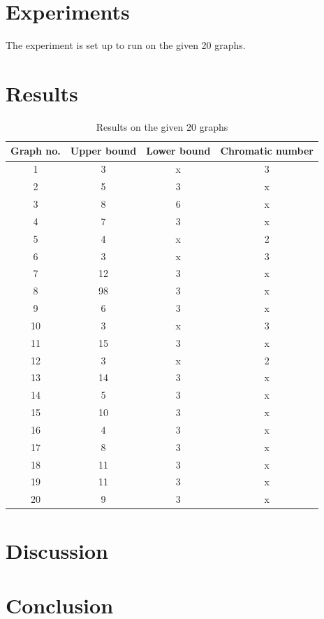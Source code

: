 \documentclass[a4paper]{report}
\begin{document}
		
	\chapter{Experiments}
	The experiment is set up to run on the given 20 graphs.
	\chapter{Results}
		\begin{table} [h!]
		\begin{center}
			\begin{tabular}{| c | c | c | c |}
				\hline
				Graph no. & Upper bound & Lower bound & Chromatic number  \\
				\hline
				1 & 3 & x & 3 \\
				\hline
				2 & 5 & 3 & x \\
				\hline
				3 & 8 & 6 & x \\
				\hline
				4 & 7 & 3 & x \\
				\hline
				5 & 4 & x & 2 \\
				\hline
				6 & 3 & x & 3 \\
				\hline
				7 & 12 & 3 & x \\
				\hline
				8 & 98 & 3 & x \\
				\hline
				9 & 6 & 3 & x \\
				\hline
				10 & 3 & x & 3 \\
				\hline
				11 & 15 & 3 & x \\
				\hline
				12 & 3 & x & 2 \\
				\hline
				13 & 14 & 3 & x \\
				\hline
				14 & 5 & 3 & x \\
				\hline
				15 & 10 & 3 & x \\
				\hline
				16 & 4 & 3 & x \\
				\hline
				17 & 8 & 3 & x \\
				\hline
				18 & 11 & 3 & x \\
				\hline
				19 & 11 & 3 & x \\
				\hline
				20 & 9 & 3 & x \\
				\hline
			\end{tabular}
		\end{center}
		\caption{Results on the given 20 graphs}
		\label{Mu table}
	\end{table}

	\chapter{Discussion}
	
	\chapter{Conclusion}
	
	
	
	
	
\end{document}

